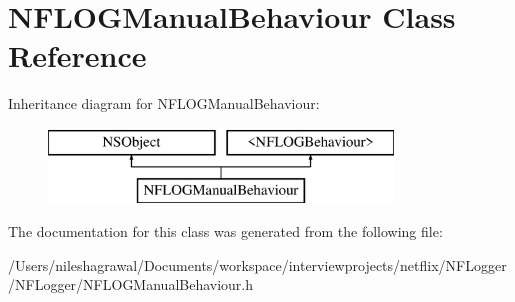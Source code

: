 \hypertarget{interface_n_f_l_o_g_manual_behaviour}{}\section{N\+F\+L\+O\+G\+Manual\+Behaviour Class Reference}
\label{interface_n_f_l_o_g_manual_behaviour}
Inheritance diagram for N\+F\+L\+O\+G\+Manual\+Behaviour\+:\begin{figure}[H]
\begin{center}
\leavevmode
\includegraphics[height=2.000000cm]{interface_n_f_l_o_g_manual_behaviour}
\end{center}
\end{figure}


The documentation for this class was generated from the following file\+:\begin{DoxyCompactItemize}
\item 
/\+Users/nileshagrawal/\+Documents/workspace/interviewprojects/netflix/\+N\+F\+Logger/\+N\+F\+Logger/N\+F\+L\+O\+G\+Manual\+Behaviour.\+h\end{DoxyCompactItemize}
